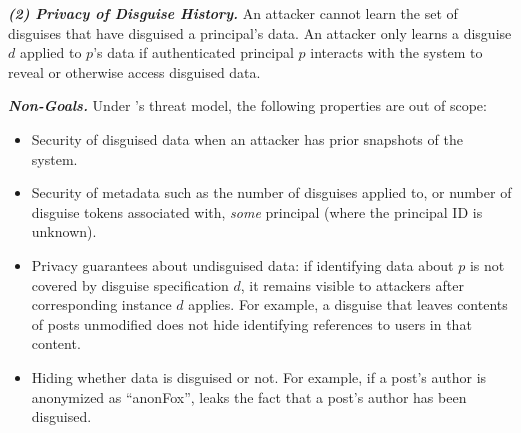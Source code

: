 \vspace{6pt}\noindent\textbf{\emph{(2) Privacy of Disguise History.}}
%
An attacker cannot learn the set of disguises that have disguised a principal's data.
%
An attacker only learns a disguise $d$ applied to $p$'s data if authenticated principal $p$
interacts with the system to reveal or otherwise access disguised data.

\vspace{6pt}\noindent\textbf{\emph{Non-Goals.}}
%
Under \sys's threat model, the following properties are out of scope:
%
\begin{itemize}
    \item Security of disguised data when an attacker has prior snapshots of the system.
    \item Security of metadata such as the number of disguises applied to, or number of
        disguise tokens associated with, \emph{some} principal (where the principal
        ID is unknown).
    \item Privacy guarantees about undisguised data: if identifying data about $p$ is not covered by
        disguise specification $d$, it remains visible to attackers after corresponding instance $d$ applies.
        For example, a disguise that leaves contents of posts unmodified does not hide identifying references
	to users in that content.
    \item Hiding whether data is disguised or not. For example, if a post's author is anonymized as ``anonFox'',
        \sys leaks the fact that a post's author has been disguised.
\end{itemize}

